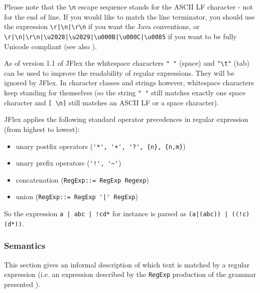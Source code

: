 \documentclass[11pt]{scrartcl}
\begin{document}
Please note that the \verb+\n+ escape sequence stands for the ASCII
LF character - not for the end of line. If you would like to match the
line terminator, you should use the expression \verb+\r|\n|\r\n+ if you want
the Java conventions, or \verb+\r|\n|\r\n|\u2028|\u2029|\u000B|\u000C|\u0085+
if you want to be fully Unicode compliant (see also \cite{unicode_rep}).

As of version 1.1 of JFlex the whitespace characters \texttt{" "}
(space) and \verb+"\t"+ (tab) can be used to improve the readability of
regular expressions. They will be ignored by JFlex. In character
classes and strings however, whitespace characters keep standing for
themselves (so the string \texttt{" "} still matches exactly one space
character and \verb+[ \n]+ still matches an ASCII LF or a space
character).

JFlex applies the following standard operator precedences in regular
expression (from highest to lowest):

\begin{itemize}
\item
unary postfix operators (\verb-'*', '+', '?', {n}, {n,m}-)

\item
unary prefix operators (\verb-'!', '~'-)

\item
concatenation (\texttt{RegExp::= RegExp Regexp})

\item
union (\verb-RegExp::= RegExp '|' RegExp-)
\end{itemize}

So the expression \verb+a | abc | !cd*+ for instance is parsed as 
\verb+(a|(abc)) | ((!c)(d*))+.

\subsubsection{Semantics\label{Semantics}}
This section gives an informal description of which text is matched by
a regular expression (i.e. an expression described by the \texttt{RegExp}
production of the grammar presented ).
\end{document}
